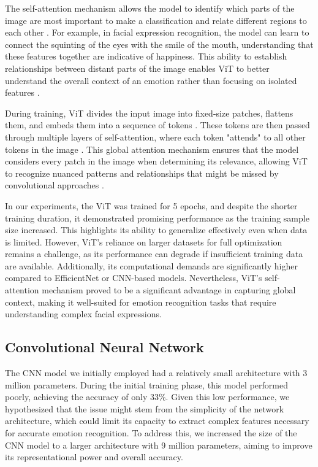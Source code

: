 \documentclass[sigconf]{acmart}
\begin{document}
The self-attention mechanism allows the model to identify which parts of the image are most important to make a classification and relate different regions to each other \cite{dosovitskiy2020image}. For example, in facial expression recognition, the model can learn to connect the squinting of the eyes with the smile of the mouth, understanding that these features together are indicative of happiness. This ability to establish relationships between distant parts of the image enables ViT to better understand the overall context of an emotion rather than focusing on isolated features \cite{dosovitskiy2020image}.

During training, ViT divides the input image into fixed-size patches, flattens them, and embeds them into a sequence of tokens \cite{dosovitskiy2020image}. These tokens are then passed through multiple layers of self-attention, where each token "attends" to all other tokens in the image \cite{dosovitskiy2020image}. This global attention mechanism ensures that the model considers every patch in the image when determining its relevance, allowing ViT to recognize nuanced patterns and relationships that might be missed by convolutional approaches \cite{dosovitskiy2020image}.

In our experiments, the ViT was trained for 5 epochs, and despite the shorter training duration, it demonstrated promising performance as the training sample size increased. This highlights its ability to generalize effectively even when data is limited. However, ViT's reliance on larger datasets for full optimization remains a challenge, as its performance can degrade if insufficient training data are available. Additionally, its computational demands are significantly higher compared to EfficientNet or CNN-based models. Nevertheless, ViT’s self-attention mechanism proved to be a significant advantage in capturing global context, making it well-suited for emotion recognition tasks that require understanding complex facial expressions.

\subsection{Convolutional Neural Network}
The CNN model we initially employed had a relatively small architecture with 3 million parameters. During the initial training phase, this model performed poorly, achieving the accuracy of only 33\%. Given this low performance, we hypothesized that the issue might stem from the simplicity of the network architecture, which could limit its capacity to extract complex features necessary for accurate emotion recognition. To address this, we increased the size of the CNN model to a larger architecture with 9 million parameters, aiming to improve its representational power and overall accuracy.
\end{document}
